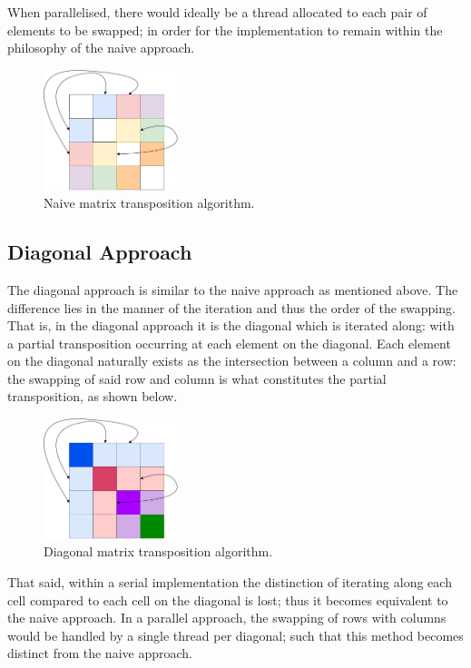 \documentclass[journal,10pt]{IEEEtran}
\begin{document}
When parallelised, there would ideally be a thread allocated to each pair of elements to be swapped; in order for the implementation to remain within the philosophy of the naive approach.

\begin{figure}[H]
    \centering
    \includegraphics[width=0.35\textwidth]{naive.pdf}
    \caption{Naive matrix transposition algorithm.}
    \label{fig:my_label}
\end{figure}

\subsection{Diagonal Approach}
The diagonal approach is similar to the naive approach as mentioned above. The difference lies in the manner of the iteration and thus the order of the swapping. That is, in the diagonal approach it is the diagonal which is iterated along: with a partial transposition occurring at each element on the diagonal. Each element on the diagonal naturally exists as the intersection between a column and a row: the swapping of said row and column is what constitutes the partial transposition, as shown below.

\begin{figure}[H]
    \centering
    \includegraphics[width=0.35\textwidth]{diag.pdf}
    \caption{Diagonal matrix transposition algorithm.}
    \label{fig:my_label}
\end{figure}


\clearpage
That said, within a serial implementation the distinction of iterating along each cell compared to each cell on the diagonal is lost; thus it becomes equivalent to the naive approach. In a parallel approach, the swapping of rows with columns would be handled by a single thread per diagonal; such that this method becomes distinct from the naive approach.
\end{document}
